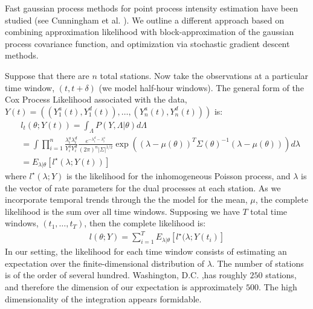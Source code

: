 \documentclass{acm_proc_article-sp}
\begin{document}
Fast gaussian process methods for point process intensity estimation have been studied (see Cunningham et al. \cite{cunningham:fastppest}).  We outline a different approach based on combining approximation likelihood with block-approximation of the gaussian process covariance function, and optimization via stochastic gradient descent methods.

Suppose that there are $n$ total stations. Now take the observations at a particular time window, $(t , t+\delta)$ (we model half-hour windows).  The general form of the Cox Process Likelihood associated with the data, \\ $Y(t) = \left( (Y_1^{a} (t), Y_1^{d} (t)), \ldots, (Y_n^{a} (t), Y_n^{d} (t)) \right) $ is:
\begin{align*}
&l_t( \theta; Y(t) ) = \int_{\Lambda} P(Y,  \Lambda | \theta) d \Lambda \\
&= \int\prod_{i=1}^n \frac{\lambda_i^{a} \lambda_i^{d}}{Y_i^{a} Y_i^{d}} \frac{e^{-\lambda_i^{d}-\lambda_i^{a} }}{(2 \pi)^{n} |\Sigma|^{1/2}} \exp \left( (\lambda - \mu (\theta) )^T \Sigma (\theta) ^{-1} (\lambda - \mu (\theta) ) \right) d \lambda \\
&= E_{\lambda | \theta} [l^{\star} ( \lambda; Y(t))]
\end{align*}
\noindent where $l^{\star} ( \lambda; Y)$ is the likelihood for the inhomogeneous Poisson process, and $\lambda$ is the vector of rate parameters for the dual processes at each station.  As we incorporate temporal trends through the the model for the mean, $\mu$, the complete likelihood is the sum over all time windows.  Supposing we have $T$ total time windows, $(t_1, \ldots, t_T)$, then the complete likelihood is:
\begin{align*}
l ( \theta; Y ) = \sum_{i=1}^T  E_{\lambda | \theta} [l^{\star} ( \lambda; Y (t_i)]
\end{align*}
In our setting, the likelihood for each time window consists of estimating an expectation over the finite-dimensional distribution of $\lambda$.  The number of stations is of the order of several hundred.  Washington, D.C. ,has roughly $250$ stations, and therefore the dimension of our expectation is approximately $500$.  The high dimensionality of the integration appears formidable. 
\end{document}
